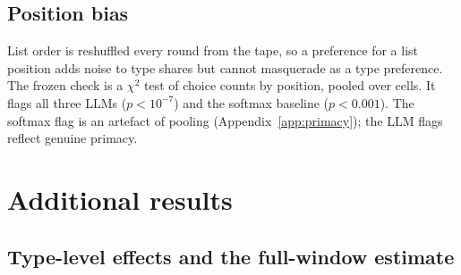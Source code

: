 \documentclass[11pt,letterpaper]{article}
\numberwithin{equation}{section}
\numberwithin{table}{section}
\numberwithin{figure}{section}
\numberwithin{algorithm}{section}
\begin{document}
\subsection{Position bias}

List order is reshuffled every round from the tape, so a preference for a list position adds noise to type shares but cannot masquerade as a type preference. The frozen check is a $\chi^2$ test of choice counts by position, pooled over cells. It flags all three LLMs ($p<10^{-7}$) and the softmax baseline ($p<0.001$). The softmax flag is an artefact of pooling (Appendix~\ref{app:primacy}); the LLM flags reflect genuine primacy.

\section{Additional results}\label{app:results}

\subsection{Type-level effects and the full-window estimate}
\end{document}
